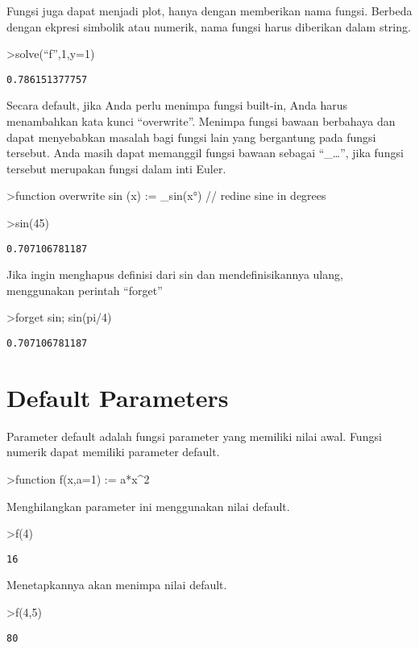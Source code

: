\documentclass[
]{book}
\begin{document}
Fungsi juga dapat menjadi plot, hanya dengan memberikan nama fungsi. Berbeda dengan ekpresi simbolik atau numerik, nama fungsi harus diberikan dalam string.

\textgreater solve(``f'',1,y=1)

\begin{verbatim}
0.786151377757
\end{verbatim}

Secara default, jika Anda perlu menimpa fungsi built-in, Anda harus menambahkan kata kunci ``overwrite''. Menimpa fungsi bawaan berbahaya dan dapat menyebabkan masalah bagi fungsi lain yang bergantung pada fungsi tersebut. Anda masih dapat memanggil fungsi bawaan sebagai ``\_\ldots'', jika fungsi tersebut merupakan fungsi dalam inti Euler.

\textgreater function overwrite sin (x) := \_sin(x°) // redine sine in degrees

\textgreater sin(45)

\begin{verbatim}
0.707106781187
\end{verbatim}

Jika ingin menghapus definisi dari sin dan mendefinisikannya ulang, menggunakan perintah ``forget''

\textgreater forget sin; sin(pi/4)

\begin{verbatim}
0.707106781187
\end{verbatim}

\section{Default Parameters}\label{default-parameters}

Parameter default adalah fungsi parameter yang memiliki nilai awal. Fungsi numerik dapat memiliki parameter default.

\textgreater function f(x,a=1) := a*x\^{}2

Menghilangkan parameter ini menggunakan nilai default.

\textgreater f(4)

\begin{verbatim}
16
\end{verbatim}

Menetapkannya akan menimpa nilai default.

\textgreater f(4,5)

\begin{verbatim}
80
\end{verbatim}
\end{document}
